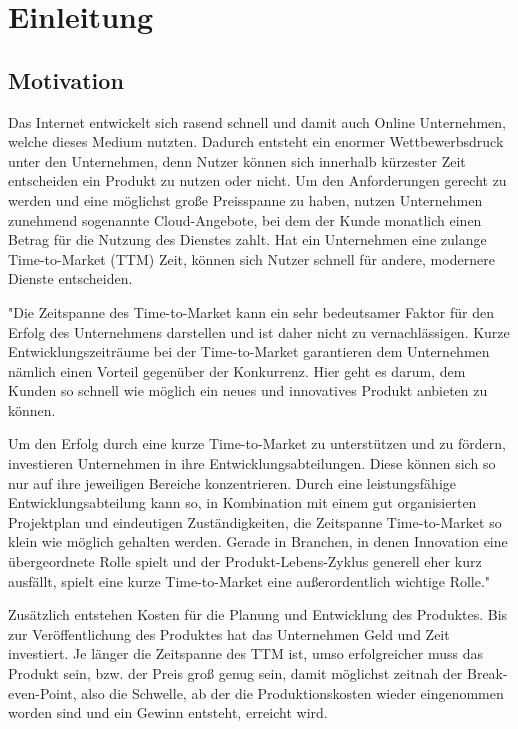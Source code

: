 \chapter{Einleitung}
\label{chap:einleitung}

\section{Motivation}
\label{sec:motivation}
Das Internet entwickelt sich rasend schnell und damit auch Online Unternehmen, welche dieses Medium nutzten. Dadurch entsteht ein enormer Wettbewerbsdruck unter den Unternehmen, denn Nutzer können sich innerhalb kürzester Zeit entscheiden ein Produkt zu nutzen oder nicht. Um den Anforderungen gerecht zu werden und eine möglichst große Preisspanne zu haben, nutzen Unternehmen zunehmend sogenannte Cloud-Angebote, bei dem der Kunde monatlich einen Betrag für die Nutzung des Dienstes zahlt. Hat ein Unternehmen eine zulange Time-to-Market (TTM) Zeit, können sich Nutzer schnell für andere, modernere Dienste entscheiden. 

"Die Zeitspanne des Time-to-Market kann ein sehr bedeutsamer Faktor für den Erfolg des Unternehmens darstellen und ist daher nicht zu vernachlässigen. Kurze Entwicklungszeiträume bei der Time-to-Market garantieren dem Unternehmen nämlich einen Vorteil gegenüber der Konkurrenz. Hier geht es darum, dem Kunden so schnell wie möglich ein neues und innovatives Produkt anbieten zu können.

Um den Erfolg durch eine kurze Time-to-Market zu unterstützen und zu fördern, investieren Unternehmen in ihre Entwicklungsabteilungen. Diese können sich so nur auf ihre jeweiligen Bereiche konzentrieren. Durch eine leistungsfähige Entwicklungsabteilung kann so, in Kombination mit einem gut organisierten Projektplan und eindeutigen Zuständigkeiten, die Zeitspanne Time-to-Market so klein wie möglich gehalten werden. Gerade in Branchen, in denen Innovation eine übergeordnete Rolle spielt und der Produkt-Lebens-Zyklus generell eher kurz ausfällt, spielt eine kurze Time-to-Market eine außerordentlich wichtige Rolle." \cite{ttm}

Zusätzlich entstehen Kosten für die Planung und Entwicklung des Produktes. Bis zur Veröffentlichung des Produktes hat das Unternehmen Geld und Zeit investiert. Je länger die Zeitspanne des TTM ist, umso erfolgreicher muss das Produkt sein, bzw. der Preis groß genug sein, damit möglichst zeitnah der Break-even-Point, also die Schwelle, ab der die Produktionskosten wieder eingenommen worden sind und ein Gewinn entsteht, erreicht wird.

